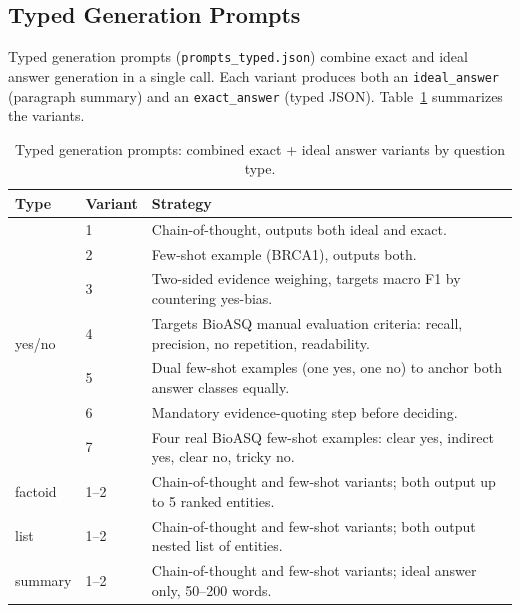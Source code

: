 \subsection{Typed Generation Prompts}
Typed generation prompts (\texttt{prompts\_typed.json}) combine exact and ideal answer generation in a single call. Each variant produces both an \texttt{ideal\_answer} (paragraph summary) and an \texttt{exact\_answer} (typed JSON). Table~\ref{tab:prompts-typed} summarizes the variants.
\begin{table}[ht]
  \centering
  \caption{Typed generation prompts: combined exact + ideal answer variants by question type.}
  \label{tab:prompts-typed}
  \footnotesize
  \begin{tabular}{llp{11.5cm}}
    \toprule
    \textbf{Type} & \textbf{Variant} & \textbf{Strategy} \\
    \midrule
    \multirow{7}{*}{yes/no} & 1 & Chain-of-thought, outputs both ideal and exact. \\
    & 2 & Few-shot example (BRCA1), outputs both. \\
    & 3 & Two-sided evidence weighing, targets macro F1 by countering yes-bias. \\
    & 4 & Targets BioASQ manual evaluation criteria: recall, precision, no repetition, readability. \\
    & 5 & Dual few-shot examples (one yes, one no) to anchor both answer classes equally. \\
    & 6 & Mandatory evidence-quoting step before deciding. \\
    & 7 & Four real BioASQ few-shot examples: clear yes, indirect yes, clear no, tricky no. \\
    \midrule
    factoid & 1--2 & Chain-of-thought and few-shot variants; both output up to 5 ranked entities. \\
    \midrule
    list    & 1--2 & Chain-of-thought and few-shot variants; both output nested list of entities. \\
    \midrule
    summary & 1--2 & Chain-of-thought and few-shot variants; ideal answer only, 50--200 words. \\
    \bottomrule
  \end{tabular}
\end{table}
